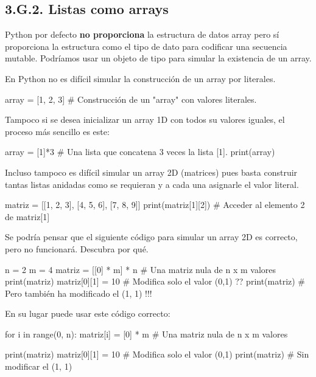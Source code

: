 \subsection*{3.G.2. Listas como arrays}


Python por defecto \textbf{no proporciona} la estructura de datos array pero sí proporciona la estructura  como el tipo de dato para codificar una secuencia mutable. Podríamos  usar un objeto de tipo  para simular la existencia de un array.

En Python no es difícil simular la construcción de un array por literales.
\begin{pyconsole}[][frame=single]
array = [1, 2, 3]  #  Construcción de un "array" con valores literales.

\end{pyconsole}

Tampoco si se desea inicializar un array 1D  con todos su valores iguales, el proceso más sencillo es este:
\begin{pyconsole}[][frame=single]
array = [1]*3  # Una lista que concatena 3 veces la lista [1].
print(array)
\end{pyconsole}

Incluso tampoco es difícil simular un array 2D (matrices) pues basta construir tantas listas anidadas como se requieran y a cada una asignarle el valor literal.

\begin{pyconsole}[][frame=single]
matriz = [[1, 2, 3], [4, 5, 6], [7, 8, 9]]
print(matriz[1][2])  # Acceder al elemento 2 de matriz[1]
\end{pyconsole}

Se podría pensar que el siguiente código para simular un array 2D es correcto, pero no funcionará. Descubra por qué.
\begin{pyconsole}[][frame=single]
n = 2
m = 4
matriz = [[0] * m] * n  # Una matriz nula de n x m valores
print(matriz)
matriz[0][1] = 10 # Modifica solo el valor (0,1) ??
print(matriz)     # Pero también ha modificado el (1, 1) !!!
\end{pyconsole}

En su lugar puede usar este código correcto:
\begin{pyconsole}[][frame=single]
for i in range(0, n):
    matriz[i] = [0] * m  # Una matriz nula de n x m valores

print(matriz)
matriz[0][1] = 10 # Modifica solo el valor (0,1)
print(matriz)     # Sin modificar el (1, 1)
\end{pyconsole}


